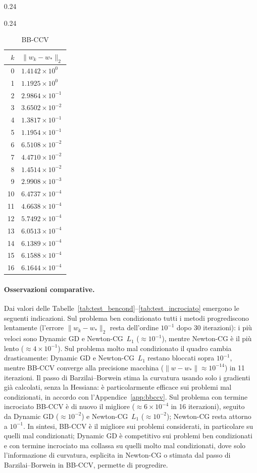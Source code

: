 \documentclass[italian, a4paper, twoside, binding=6mm]{sapthesis}
\begin{document}
\begin{table}[H]
\begin{subtable}{0.24\textwidth}
\end{subtable}\hfill
\begin{subtable}{0.24\textwidth}
\centering
\caption{BB-CCV}
\begin{tabular}{@{}rl@{}}
\toprule
$k$ & $\|w_k-w_*\|_2$\\
\midrule
0 & $1.4142\times10^{0}$\\
1 & $1.1925\times10^{0}$\\
2 & $2.9864\times10^{-1}$\\
3 & $3.6502\times10^{-2}$\\
4 & $1.3817\times10^{-1}$\\
5 & $1.1954\times10^{-1}$\\
6 & $6.5108\times10^{-2}$\\
7 & $4.4710\times10^{-2}$\\
8 & $1.4514\times10^{-2}$\\
9 & $2.9908\times10^{-3}$\\
10 & $6.4737\times10^{-4}$\\
11 & $4.6638\times10^{-4}$\\
12 & $5.7492\times10^{-4}$\\
13 & $6.0513\times10^{-4}$\\
14 & $6.1389\times10^{-4}$\\
15 & $6.1588\times10^{-4}$\\
16 & $6.1644\times10^{-4}$\\
\bottomrule
\end{tabular}
\end{subtable}
\end{table}

\paragraph{Osservazioni comparative.} Dai valori delle
Tabelle~\ref{tab:test_bencond}--\ref{tab:test_incrociato} emergono le seguenti
indicazioni. Sul problema ben condizionato tutti i metodi progrediscono
lentamente (l'errore $\|w_k-w_*\|_2$ resta dell'ordine $10^{-1}$ dopo 30
iterazioni): i più veloci sono Dynamic GD e Newton-CG~$L_1$
($\approx 10^{-1}$), mentre Newton-CG è il più lento
($\approx 4\times10^{-1}$). Sul problema molto mal condizionato il quadro
cambia drasticamente: Dynamic GD e Newton-CG~$L_1$ restano bloccati sopra
$10^{-1}$, mentre BB-CCV converge alla precisione macchina
($\|w-w_*\| \approx 10^{-14}$) in 11 iterazioni. Il passo di
Barzilai--Borwein stima la curvatura usando solo i gradienti già calcolati,
senza la Hessiana: è particolarmente efficace sui problemi mal
condizionati, in accordo con l'Appendice~\ref{app:bbccv}. Sul problema con
termine incrociato BB-CCV è di nuovo il migliore ($\approx 6\times10^{-4}$ in
16 iterazioni), seguito da Dynamic GD ($\approx 10^{-2}$) e Newton-CG~$L_1$
($\approx 10^{-2}$); Newton-CG resta attorno a $10^{-1}$. In sintesi, BB-CCV
è il migliore sui problemi considerati, in
particolare su quelli mal condizionati; Dynamic GD è competitivo sui problemi
ben condizionati e con termine incrociato ma collassa su quelli molto mal
condizionati, dove solo l'informazione di curvatura, esplicita in Newton-CG
o stimata dal passo di Barzilai--Borwein in BB-CCV, permette di progredire.
\end{document}
